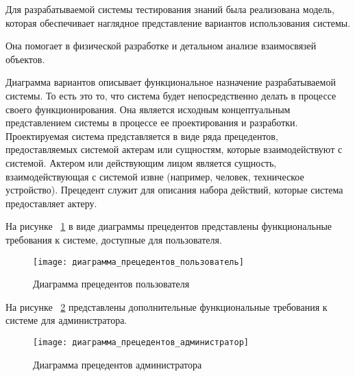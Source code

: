 Для разрабатываемой системы тестирования знаний была реализована модель, которая обеспечивает наглядное представление вариантов использования системы.

Она помогает в физической разработке и детальном анализе взаимосвязей объектов.

Диаграмма вариантов описывает функциональное назначение разрабатываемой системы. То есть это то, что система будет непосредственно делать в процессе своего функционирования. Она является исходным концептуальным представлением системы в процессе ее проектирования и разработки. Проектируемая система представляется в виде ряда прецедентов, предоставляемых системой актерам или сущностям, которые взаимодействуют с системой. Актером или действующим лицом является сущность, взаимодействующая с системой извне (например, человек, техническое устройство). Прецедент служит для описания набора действий, которые система предоставляет актеру.

\clearpage

На рисунке ~\ref{user_precedent_diagram:image} в виде диаграммы прецедентов представлены функциональные требования к системе, доступные для пользователя.

\begin{figure}[H]
	\texttt{[image: диаграмма\_прецедентов\_пользователь]}
	\caption{Диаграмма прецедентов пользователя}
	\label{user_precedent_diagram:image}
\end{figure}

\clearpage

На рисунке ~\ref{admin_precedent_diagram:image} представлены дополнительные функциональные требования к системе для администратора.

\begin{figure}[H]
	\texttt{[image: диаграмма\_прецедентов\_администратор]}
	\caption{Диаграмма прецедентов администратора}
	\label{admin_precedent_diagram:image}
\end{figure}

